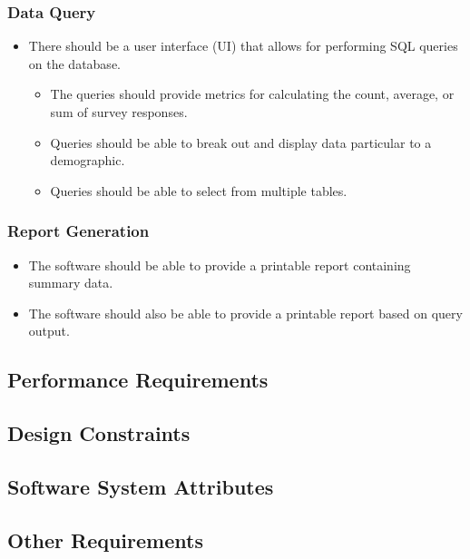 \documentclass[letterpaper,10pt,titlepage, draftclsnofoot,onecolumn]{IEEEtran}
\begin{document}
\subsubsection{Data Query}
\begin{itemize}
\item There should be a user interface (UI) that allows for performing SQL queries on the database.
	\begin{itemize}
	\item The queries should provide metrics for calculating the count, average, or sum of survey responses.
	\item Queries should be able to break out and display data particular to a demographic.
	\item Queries should be able to select from multiple tables.
	\end{itemize}
\end{itemize}

\subsubsection{Report Generation}
\begin{itemize}
\item The software should be able to provide a printable report containing summary data.
\item The software should also be able to provide a printable report based on query output.
\end{itemize}

\subsection{Performance Requirements}
\subsection{Design Constraints}
\subsection{Software System Attributes}
\subsection{Other Requirements}
\end{document}
